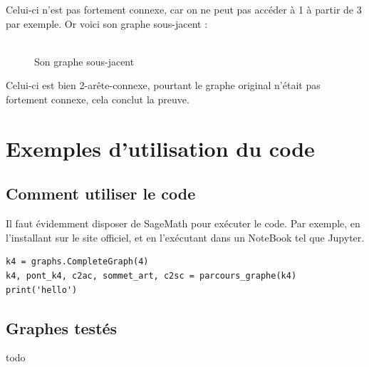 \documentclass{article}      %
\begin{document}
Celui-ci n'est pas fortement connexe, car on ne peut pas accéder à 1 à partir de 3 par exemple.
Or voici son graphe sous-jacent :
\begin{figure}[H]
    \centering
    \\Son graphe sous-jacent
\end{figure}
Celui-ci est bien 2-arête-connexe, pourtant le graphe original n'était pas fortement connexe, cela conclut la preuve.



\section{Exemples d'utilisation du code}
\subsection{Comment utiliser le code}
Il faut évidemment disposer de SageMath pour exécuter le code.
Par exemple, en l'installant sur le site officiel, et en l'exécutant dans un NoteBook tel que Jupyter.

\begin{lstlisting}[style=code-style]
k4 = graphs.CompleteGraph(4)
k4, pont_k4, c2ac, sommet_art, c2sc = parcours_graphe(k4)
print('hello')
\end{lstlisting}

\subsection{Graphes testés}
todo
\end{document}
